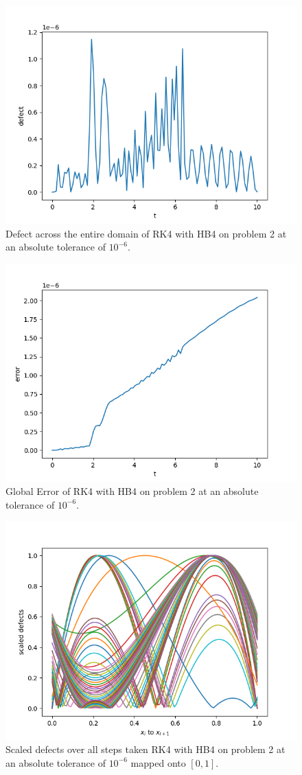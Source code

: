 \documentclass{article}
\begin{document}
\begin{figure}[H]
\centering
\includegraphics[width=0.7\linewidth]{./figures/rk4_with_hb4_p2_global_defect}
\caption{Defect across the entire domain of RK4 with HB4 on problem 2 at an absolute tolerance of $10^{-6}$.}
\label{fig:rk4_with_hb4_p2_global_defect}
\end{figure}

\begin{figure}[H]
\centering
\includegraphics[width=0.7\linewidth]{./figures/rk4_with_hb4_p2_global_error}
\caption{Global Error of RK4 with HB4 on problem 2 at an absolute tolerance of $10^{-6}$.}
\label{fig:rk4_with_hb4_p2_global_error}
\end{figure}

\begin{figure}[H]
\centering
\includegraphics[width=0.7\linewidth]{./figures/rk4_with_hb4_p2_scaled_defects}
\caption{Scaled defects over all steps taken RK4 with HB4 on problem 2 at an absolute tolerance of $10^{-6}$ mapped onto $[0, 1]$.}
\label{fig:rk4_with_hb4_p2_scaled_defects}
\end{figure}
\end{document}
